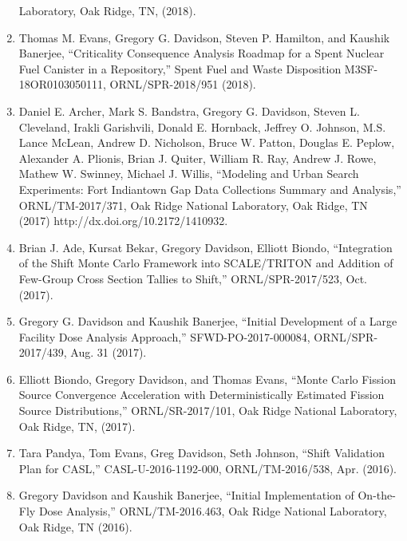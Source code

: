 \documentclass[letterpaper,11pt]{article}
\begin{document}
\begin{enumerate}
    Laboratory, Oak Ridge, TN, (2018).
  \item Thomas M. Evans, Gregory G. Davidson, Steven P. Hamilton,
    and Kaushik Banerjee, ``Criticality Consequence Analysis Roadmap
    for a Spent Nuclear Fuel Canister in a Repository,'' Spent Fuel
    and Waste Disposition M3SF-18OR0103050111, ORNL/SPR-2018/951
    (2018). 
  \item Daniel E. Archer, Mark S. Bandstra, Gregory G. Davidson,
    Steven L. Cleveland, Irakli Garishvili, Donald E. Hornback,
    Jeffrey O. Johnson, M.S. Lance McLean, Andrew D. Nicholson, Bruce
    W. Patton, Douglas E. Peplow, Alexander A. Plionis, Brian
    J. Quiter, William R. Ray, Andrew J. Rowe, Mathew W. Swinney,
    Michael J. Willis, ``Modeling and Urban Search Experiments: Fort
    Indiantown Gap Data Collections Summary and Analysis,''
    ORNL/TM-2017/371, Oak Ridge National Laboratory, Oak Ridge, TN
    (2017) http://dx.doi.org/10.2172/1410932.
  \item Brian J. Ade, Kursat Bekar, Gregory Davidson, Elliott
    Biondo, ``Integration of the Shift Monte Carlo Framework into
    SCALE/TRITON and Addition of Few-Group Cross Section Tallies to
    Shift,'' ORNL/SPR-2017/523, Oct. (2017).
  \item Gregory G. Davidson and Kaushik Banerjee, ``Initial
    Development of a Large Facility Dose Analysis Approach,''
    SFWD-PO-2017-000084, ORNL/SPR-2017/439, Aug. 31 (2017).
  \item Elliott Biondo, Gregory Davidson, and Thomas Evans, ``Monte
    Carlo Fission Source Convergence Acceleration with
    Deterministically Estimated Fission Source Distributions,''
    ORNL/SR-2017/101, Oak Ridge National Laboratory, Oak Ridge, TN,
    (2017).
  \item Tara Pandya, Tom Evans, Greg Davidson, Seth Johnson, ``Shift
    Validation Plan for CASL,'' CASL-U-2016-1192-000,
    ORNL/TM-2016/538, Apr. (2016).
  \item Gregory Davidson and Kaushik Banerjee, ``Initial
    Implementation of On-the-Fly Dose Analysis,'' ORNL/TM-2016.463,
    Oak Ridge National Laboratory, Oak Ridge, TN (2016).
\end{enumerate}

\end{document}
